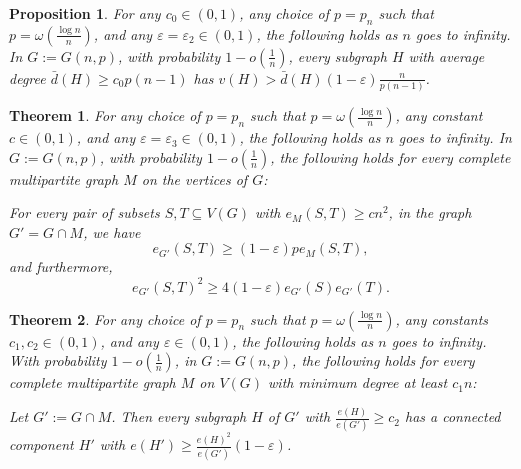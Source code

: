 \documentclass[10pt,a4paper]{amsart}
\newtheorem{prop}{Proposition}
\newtheorem{theorem}{Theorem}
\begin{document}
\begin{prop}
    \label{prop:degree-bound}
    For any $c_0\in (0, 1)$, any choice of $p=p_n$ such that $p=\omega(\frac{\log n}n)$, and any $\varepsilon=\varepsilon_2\in (0,1)$, the following holds as $n$ goes to infinity. 
    In $G := G(n, p)$, with probability $1-o(\frac{1}{n})$, every subgraph $H$ with average degree $\bar d(H)\ge c_0 p(n-1)$ has $v(H)> \bar d(H)(1-\varepsilon)\frac{n}{p(n-1)}$.
\end{prop}

\begin{theorem}
	\label{thm:corollary}
    For any choice of $p=p_n$ such that $p=\omega(\frac{\log n}n)$, any constant $c \in (0, 1)$, and any $\varepsilon = \varepsilon_3\in (0,1)$, the following holds as $n$ goes to infinity. In $G:=G(n,p)$, with probability $1-o(\frac1n)$, the following holds for every complete multipartite graph $M$ on the vertices of $G$:
 
    For every pair of subsets $S, T\subseteq V(G)$ with $e_M(S, T) \ge cn^2$, in the graph $G'=G\cap M$, we have 
    \[
        e_{G'}(S,T)\ge (1-\varepsilon)pe_M(S,T),
    \]
    and furthermore,
    \[e_{G'}(S, T)^2\ge 4(1-\varepsilon)e_{G'}(S) e_{G'}(T).\]
\end{theorem}

\begin{theorem}
	\label{thm:multipartite}
    For any choice of $p=p_n$ such that $p=\omega(\frac{\log n}n)$, any constants $c_1,c_2 \in (0, 1)$, and any $\varepsilon\in (0,1)$, the following holds as $n$ goes to infinity. With probability $1-o(\frac1n)$, in $G:=G(n, p)$, the following holds for every complete multipartite graph $M$ on $V(G)$ with minimum degree at least $c_1 n$:
    
    Let $G':=G\cap M$. Then every subgraph $H$ of $G'$ with $\frac{e(H)}{e(G')}\ge c_2$ has a connected component $H'$ with $e(H')\ge \frac{e(H)^2}{e(G')}(1-\varepsilon)$.
\end{theorem}
\end{document}
